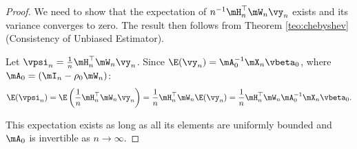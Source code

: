 \begin{proof}\label{proof:consistency-plimHQ}
We need to show that the expectation of $n^{-1}\mH_n^\top\mW_n\vy_n$ exists and its variance converges to zero. The result then follows from Theorem \ref{teo:chebyshev} (Consistency of Unbiased Estimator).

Let $\vpsi_n = \frac{1}{n}\mH_n^\top\mW_n\vy_n$. Since $\E(\vy_n) = \mA_0^{-1}\mX_n\vbeta_0$, where $\mA_0 = \left(\mI_n - \rho_0\mW_n\right)$:
\begin{equation*}
\E(\vpsi_n) =\E\left(\frac{1}{n}\mH_n^\top\mW_n\vy_n\right) = \frac{1}{n}\mH_n^\top\mW_n\E(\vy_n) = \frac{1}{n}\mH_n^\top\mW_n\mA_0^{-1}\mX_n\vbeta_0.
\end{equation*}

This expectation exists as long as all its elements are uniformly bounded and $\mA_0$ is invertible as $n\to\infty$. 


\end{proof}
